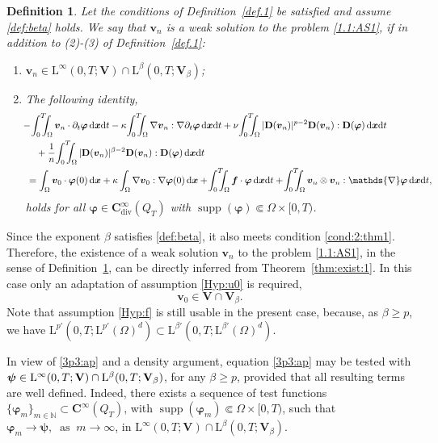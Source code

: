 \documentclass[12pt,reqno]{amsart}
\numberwithin{equation}{section}
\newtheorem{definition}[theorem]{Definition}
\theoremstyle{definition}
\def\1{\Omega}
\def\dx{\,\mathrm{d}\boldsymbol{x}}
\def\dxt{\,\mathrm{d}\boldsymbol{x}\mathrm{d}t}
\def\div{\operatorname{div}}
\def\supp{\operatorname{supp}}
\def\L{\mathrm{L}}
\def\vv{\boldsymbol{v}}
\def\f{\boldsymbol{f}}
\def\bfC{\mathbf{C}}
\def\bfV{\mathbf{V}}
\def\bfD{\mathbf{D}}
\def\bfi{\boldsymbol{\varphi}}
\def\bpsi{\boldsymbol{\psi}}
\begin{document}
\begin{definition}\label{def.1:ap}
Let the conditions of Definition~\ref{def.1} be satisfied and assume \eqref{def:beta} holds.
We say that $\vv_n$ is a weak solution to the problem \eqref{1.1:AS1}, if in addition to (2)-(3) of Definition~\ref{def.1}:
\begin{enumerate}
  \item[(1')] $\vv_n\in\L^\infty(0,T;\bfV)\cap \L^\beta(0,T;\bfV_\beta)$;
  \item[(4')] The following identity,
\begin{equation}\label{3p3:ap}
\begin{split}
&\hspace{-2mm}
-\!\int_{0}^{T}\!\!\!\!\int_{\Omega}\vv_n\cdot\partial_t\bfi \dxt - \kappa\!\int_{0}^{T}\!\!\!\!\int_{\Omega}\nabla\vv_n:\nabla\partial_t\bfi\dxt
+
\nu\!\int_{0}^{T}\!\!\!\!\int_{\Omega}|\bfD(\vv_n)|^{p-2}\bfD(\vv_n):\bfD(\bfi)\dxt
\\
&\quad   + \frac{1}{n}\!\int_{0}^{T}\!\!\!\!\int_{\Omega}|\bfD(\vv_n)|^{\beta-2}\bfD(\vv_n):\bfD(\bfi)\dxt\\
&=
\int_\1\vv_0\cdot\bfi(0)\dx + \kappa\int_\1\nabla\vv_0:\nabla\bfi(0)\dx + \!\int_{0}^{T}\!\!\!\!\int_{\Omega}\f\cdot\bfi\dxt + \!\int_{0}^{T}\!\!\!\!\int_{\Omega} \vv_n\otimes\vv_n:\mathds{\nabla}\bfi\dxt,
\end{split}
\end{equation}
holds for all $\bfi\in \bfC^\infty_{\div}(Q_T)$ with $\supp(\bfi) \Subset \Omega\times [0,T)$.
\end{enumerate}
\end{definition}

{
Since the exponent $\beta$ satisfies \eqref{def:beta}, it also meets condition \eqref{cond:2:thm1}.
Therefore, the existence of a weak solution $\vv_n$ to the problem \eqref{1.1:AS1}, in the sense of Definition~\ref{def.1:ap},
can be directly inferred from Theorem~\ref{thm:exist:1}}.
In this case only an adaptation of assumption \eqref{Hyp:u0} is required,
\begin{equation*}%
\vv_0\in\bfV\cap\bfV_\beta.
\end{equation*}
Note that assumption \eqref{Hyp:f} is still usable in the present case, because, as $\beta\geq p$, we have
$\L^{p'}(0,T;\L^{p'}(\1)^d)\subset\L^{\beta'}(0,T;\L^{\beta'}(\1)^d)$.


{ In view of \eqref{3p3:ap} and a density argument, equation \eqref{3p3:ap} may be tested with
	$\bpsi \in \L^\infty(0,T;\mathbf{V}) \break \cap \L^\beta(0,T;\mathbf{V}_\beta)$, for any $\beta \ge p$, provided that all resulting terms are well defined.
Indeed, there exists a sequence of test functions $\{\bfi_m\}_{m\in\mathbb{N}} \subset \mathbf{C}^\infty(Q_T)$, with $\operatorname{supp}(\bfi_m) \Subset \Omega \times [0,T)$, such that
	$\bfi_m \to \bpsi, \  \text{ as } \ m \to \infty$, in $\L^\infty(0,T;\mathbf{V}) \cap \L^\beta(0,T;\mathbf{V}_\beta)$.
}
\end{document}
